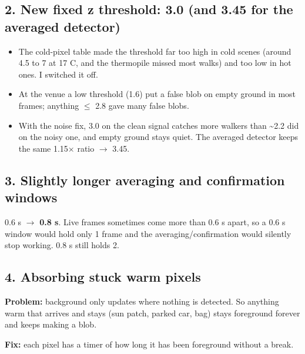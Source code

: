 \documentclass[11pt,a4paper]{article}
\providecommand{\tightlist}{\setlength{\itemsep}{0pt}\setlength{\parskip}{0pt}}
\begin{document}
\hypertarget{new-fixed-z-threshold-3.0-and-3.45-for-the-averaged-detector}{%
\subsection{2. New fixed z
threshold: 3.0 (and 3.45 for
the averaged
detector)}\label{new-fixed-z-threshold-3.0-and-3.45-for-the-averaged-detector}}

\begin{itemize}
\tightlist
\item
  The cold-pixel table made
  the threshold far too high
  in cold scenes (around 4.5
  to 7 at 17 \textdegree{}C, and the
  thermopile missed most
  walks) and too low in hot
  ones. I switched it off.
\item
  At the venue a low threshold
  (1.6) put a false blob on
  empty ground in most frames;
  anything $\leq$ 2.8 gave many
  false blobs.
\item
  With the noise fix, 3.0 on
  the clean signal catches
  more walkers than
  \textasciitilde2.2 did on
  the noisy one, and empty
  ground stays quiet. The
  averaged detector keeps the
  same 1.15$\times$ ratio $\rightarrow$ 3.45.
\end{itemize}

\hypertarget{slightly-longer-averaging-and-confirmation-windows}{%
\subsection{3. Slightly longer
averaging and confirmation
windows}\label{slightly-longer-averaging-and-confirmation-windows}}

0.6 s $\rightarrow$ \textbf{0.8 s}. Live
frames sometimes come more
than 0.6 s apart, so a 0.6 s
window would hold only 1 frame
and the averaging/confirmation
would silently stop working.
0.8 s still holds 2.

\hypertarget{absorbing-stuck-warm-pixels}{%
\subsection{4. Absorbing stuck
warm
pixels}\label{absorbing-stuck-warm-pixels}}

\textbf{Problem:} background
only updates where nothing is
detected. So anything warm
that arrives and stays (sun
patch, parked car, bag) stays
foreground forever and keeps
making a blob.

\textbf{Fix:} each pixel has a
timer of how long it has been
foreground without a break.
\end{document}
